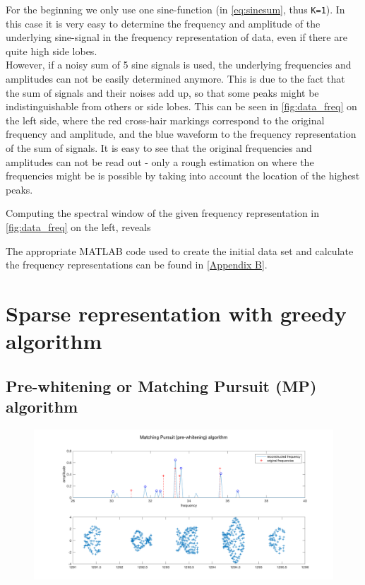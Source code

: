 For the beginning we only use one sine-function (in \cref{eq:sinesum}, thus \texttt{K=1}). In this case it is very easy to determine the frequency and amplitude of the underlying sine-signal in the frequency representation of data, even if there are quite high side lobes. \\
However, if a noisy sum of 5 sine signals is used, the underlying frequencies and amplitudes can not be easily determined anymore. This is due to the fact that the sum of signals and their noises add up, so that some peaks might be indistinguishable from others or side lobes. This can be seen in \cref{fig:data_freq} on the left side, where the red cross-hair markings correspond to the original frequency and amplitude, and the blue waveform to the frequency representation of the sum of signals. It is easy to see that the original frequencies and amplitudes can not be read out - only a rough estimation on where the frequencies might be is possible by taking into account the location of the highest peaks.

Computing the spectral window of the given frequency representation in \cref{fig:data_freq} on the left, reveals

The appropriate MATLAB code used to create the initial data set and calculate the frequency representations can be found in \cref{Appendix B}.


\section{Sparse representation with greedy algorithm}

\subsection{Pre-whitening or Matching Pursuit (MP) algorithm}

\begin{figure}[h!]
	\centering
	\includegraphics[width=\textwidth-3em]{images/mp}
	\caption{}
	\label{fig:mp}
\end{figure}



